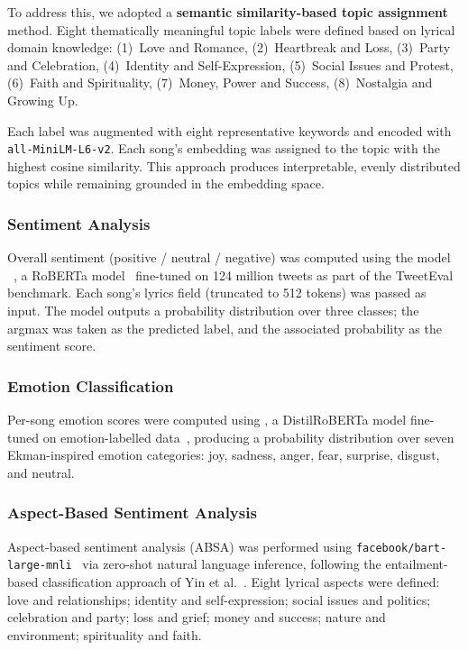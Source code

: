 \documentclass[pdflatex,sn-mathphys-num]{sn-jnl}
\begin{document}
To address this, we adopted a \textbf{semantic similarity-based topic assignment} method. Eight thematically meaningful topic labels were defined based on lyrical domain knowledge: (1)~Love and Romance, (2)~Heartbreak and Loss, (3)~Party and Celebration, (4)~Identity and Self-Expression, (5)~Social Issues and Protest, (6)~Faith and Spirituality, (7)~Money, Power and Success, (8)~Nostalgia and Growing Up.

Each label was augmented with eight representative keywords and encoded with \texttt{all-MiniLM-L6-v2}. Each song's embedding was assigned to the topic with the highest cosine similarity. This approach produces interpretable, evenly distributed topics while remaining grounded in the embedding space.

\subsubsection{Sentiment Analysis}\label{subsubsec4a}

Overall sentiment (positive / neutral / negative) was computed using the model ~\cite{barbieri2020tweeteval}, a RoBERTa model~\cite{liu2019roberta} fine-tuned on 124 million tweets as part of the TweetEval benchmark. Each song's lyrics field (truncated to 512 tokens) was passed as input. The model outputs a probability distribution over three classes; the argmax was taken as the predicted label, and the associated probability as the sentiment score.

\subsubsection{Emotion Classification}\label{subsubsec4b}

Per-song emotion scores were computed using , a DistilRoBERTa model fine-tuned on emotion-labelled data~\cite{demszky2020goemotions}, producing a probability distribution over seven Ekman-inspired emotion categories: joy, sadness, anger, fear, surprise, disgust, and neutral.

\subsubsection{Aspect-Based Sentiment Analysis}\label{subsubsec4}

Aspect-based sentiment analysis (ABSA) was performed using \texttt{facebook/bart-large-mnli}~\cite{lewis2020bart} via zero-shot natural language inference, following the entailment-based classification approach of Yin et al.~\cite{yin2019zeroshot}. Eight lyrical aspects were defined: love and relationships; identity and self-expression; social issues and politics; celebration and party; loss and grief; money and success; nature and environment; spirituality and faith.
\end{document}
